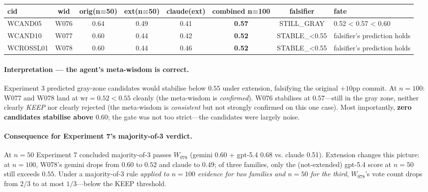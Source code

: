 \documentclass{article}
\begin{document}
\begin{CJK*}{UTF8}{gbsn}
\begin{center}\small
\begin{tabular}{l c c c c c c l}
  \toprule
  cid & wid & orig(n=50) & ext(n=50) & claude(ext) & combined n=100 & falsifier
    & fate \\
  \midrule
  WCAND05 & W076 & 0.64 & 0.49 & 0.41 & \textbf{0.57}
    & STILL\_GRAY & 0.52 < 0.57 < 0.60 \\
  WCAND10 & W077 & 0.60 & 0.44 & 0.42 & \textbf{0.52}
    & STABLE\_<0.55 & falsifier's prediction holds \\
  WCROSSL01 & W078 & 0.60 & 0.44 & 0.46 & \textbf{0.52}
    & STABLE\_<0.55 & falsifier's prediction holds \\
  \bottomrule
\end{tabular}
\end{center}

\paragraph{Interpretation — the agent's meta-wisdom is correct.}
Experiment 3 predicted gray-zone candidates would stabilise below
\(0.55\) under extension, falsifying the original \(+10\)pp
commit. At \(n = 100\): W077 and W078 land at \(\text{wr} = 0.52
< 0.55\) cleanly (the meta-wisdom is \emph{confirmed}). W076
stabilises at \(0.57\)—still in the gray zone, neither clearly
\emph{KEEP} nor clearly rejected (the meta-wisdom is
\emph{consistent} but not strongly confirmed on this one case).
Most importantly, \textbf{zero candidates stabilise above
\(0.60\)}; the gate was not too strict—the candidates were
largely noise.

\paragraph{Consequence for Experiment 7's majority-of-3
verdict.} At \(n = 50\) Experiment 7 concluded majority-of-3
passes \(W_{078}\) (gemini 0.60 + gpt-5.4 0.68 vs. claude 0.51).
Extension changes this picture: at \(n = 100\), W078's gemini
drops from \(0.60\) to \(0.52\) and claude to \(0.49\); of
three families, only the (not-extended) gpt-5.4 score at
\(n = 50\) still exceeds \(0.55\). Under a majority-of-3 rule
\emph{applied to \(n = 100\) evidence for two families and
\(n = 50\) for the third}, \(W_{078}\)'s vote count drops from
\(2/3\) to at most \(1/3\)—below the KEEP threshold.


\end{CJK*}
\end{document}
